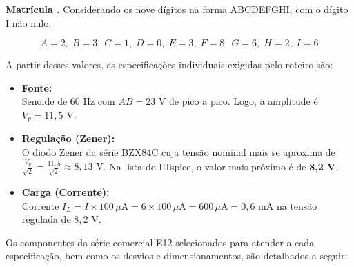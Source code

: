 \documentclass[11pt,a4paper]{article}
\begin{document}
\begin{espec}

\textbf{Matrícula .} Considerando os nove dígitos na forma ABCDEFGHI, com o dígito I não nulo,

\begin{equation}
    A=2,\; B=3,\; C=1,\; D=0,\; E=3,\; F=8,\; G=6,\; H=2,\; I=6
\end{equation}

A partir desses valores, as especificações individuais exigidas pelo roteiro são:

\begin{itemize}
    \item \textbf{Fonte:} \\
    Senoide de 60 Hz com $AB = 23\text{ V}$ de pico a pico. Logo, a amplitude é $V_p = 11{,}5\text{ V}$.

    \vspace{0.3cm}
    
    \item \textbf{Regulação (Zener):} \\
    O diodo Zener da série BZX84C cuja tensão nominal mais se aproxima de $\frac{V_p}{\sqrt{2}} = \frac{11{,}5}{\sqrt{2}} \approx 8{,}13\text{ V}$. Na lista do LTspice, o valor mais próximo é de \textbf{8,2 V}.
    
    \vspace{0.3cm}
    
    \item \textbf{Carga (Corrente):} \\
    Corrente $I_L = I \times 100\,\mu\text{A} = 6 \times 100\,\mu\text{A} = 600\,\mu\text{A} = 0{,}6\text{ mA}$ na tensão regulada de $8{,}2\text{ V}$.
\end{itemize}

\end{espec}

Os componentes da série comercial E12 selecionados para atender a cada especificação, bem como os desvios e dimensionamentos, são detalhados a seguir:
\end{document}
